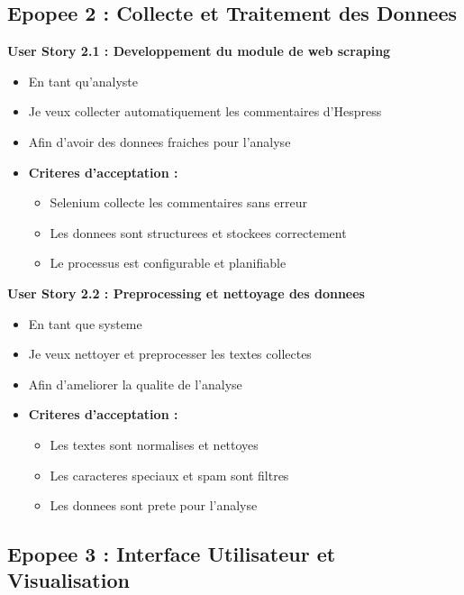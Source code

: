\subsection{Epopee 2 : Collecte et Traitement des Donnees}

\textbf{User Story 2.1 : Developpement du module de web scraping}
\begin{itemize}
    \item En tant qu'analyste
    \item Je veux collecter automatiquement les commentaires d'Hespress
    \item Afin d'avoir des donnees fraiches pour l'analyse
    \item \textbf{Criteres d'acceptation :}
    \begin{itemize}
        \item Selenium collecte les commentaires sans erreur
        \item Les donnees sont structurees et stockees correctement
        \item Le processus est configurable et planifiable
    \end{itemize}
\end{itemize}

\textbf{User Story 2.2 : Preprocessing et nettoyage des donnees}
\begin{itemize}
    \item En tant que systeme
    \item Je veux nettoyer et preprocesser les textes collectes
    \item Afin d'ameliorer la qualite de l'analyse
    \item \textbf{Criteres d'acceptation :}
    \begin{itemize}
        \item Les textes sont normalises et nettoyes
        \item Les caracteres speciaux et spam sont filtres
        \item Les donnees sont prete pour l'analyse
    \end{itemize}
\end{itemize}

\subsection{Epopee 3 : Interface Utilisateur et Visualisation}

